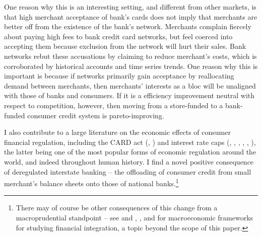 \documentclass[12pt,english]{article}
\begin{document}
One reason why this is an interesting setting, and different from other markets, is that high merchant acceptance of bank's cards does not imply that merchants are better off from the existence of the bank's network. Merchants complain fiercely about paying high fees to bank credit card networks, but feel coerced into accepting them because exclusion from the network will hurt their sales. Bank networks rebut these accusations by claiming to reduce merchant's costs, which is corroborated by historical accounts and time series trends. One reason why this is important is because if networks primarily gain acceptance by reallocating demand between merchants, then merchants' interests as a bloc will be unaligned with those of banks and consumers. If it is a efficiency improvement neutral with respect to competition, however, then moving from a store-funded to a bank-funded consumer credit system is pareto-improving. 

I also contribute to a large literature on the economic effects of consumer financial regulation, including the CARD act (\cite{agarwal_regulating_2015}, \cite{nelson_private_2017}) and interest rate caps (\cite{cuesta_price_2021}, \cite{maimbo_interest_2014}, \cite{glaeser_neither_1998}, \cite{chatterji_entrepreneurial_2012}, \cite{zinman_impact_2003}, \cite{knittel_price_2003}), the latter being one of the most popular forms of economic regulation around the world, and indeed throughout human history. I find a novel positive consequence of deregulated interstate banking -- the offloading of consumer credit from small merchant's balance sheets onto those of national banks.\footnote{There may  of course be other consequences of this change from a macroprudential standpoint -- see \cite{beck_big_2010} and \cite{chong_effects_1991}, \cite{del_negro_aggregate_nodate}, and \cite{nakamura_fiscal_2014} for macroeconomic frameworks for studying financial integration, a topic beyond the scope of this paper.} 
\end{document}
